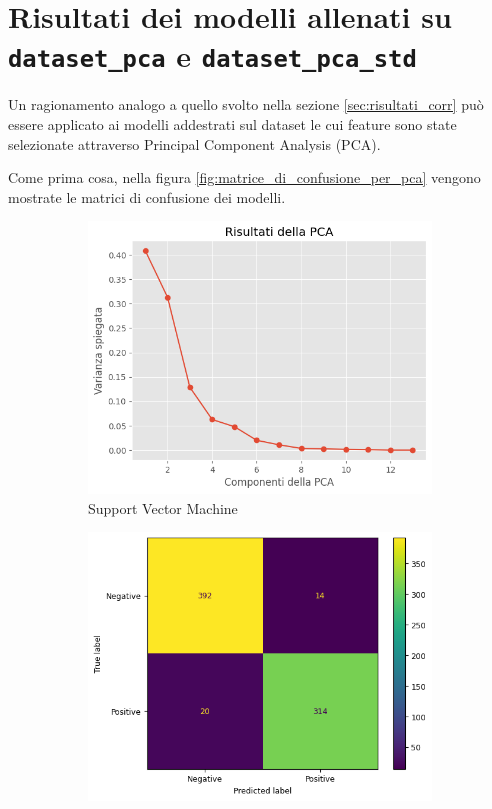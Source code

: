 
\section{Risultati dei modelli allenati su \texttt{dataset\_pca} e \texttt{dataset\_pca\_std}} \label{sec:risultati_pca}
Un ragionamento analogo a quello svolto nella sezione \ref{sec:risultati_corr} può essere
applicato ai modelli addestrati sul dataset le cui feature sono state selezionate
attraverso Principal Component Analysis (PCA). 

Come prima cosa, nella figura \ref{fig:matrice_di_confusione_per_pca} vengono
mostrate le matrici di confusione dei modelli.

\begin{figure}[!ht]
    \centering
    \begin{subfigure}{0.45\textwidth}
        \centering
        \includegraphics[width=\textwidth]{img/analisi/pcaVarianza.png}
        \caption{Support Vector Machine}
        \label{fig:matrice_di_confusione_per_SVM_pca}
    \end{subfigure}
    \hfill
    \begin{subfigure}{.45\textwidth}
        \centering
        \includegraphics[width=\textwidth]{img/gnb/confusion_matrix_pca.png}

\end{subfigure}
\end{figure}
